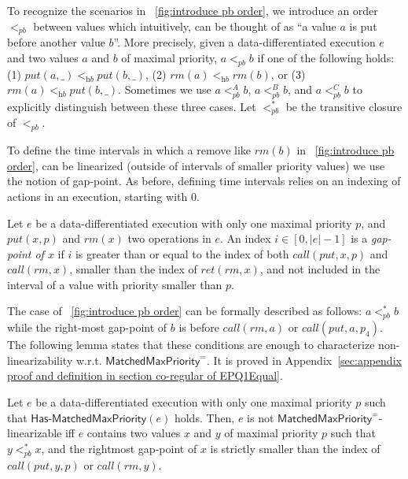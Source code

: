 To recognize the scenarios in \figurename~\ref{fig:introduce pb order}, we introduce an order $<_{\textit{pb}}$ between values which intuitively, can be thought of as ``a value $a$ is put before another value $b$''.
More precisely, given a data-differentiated execution $e$ and two values $a$ and $b$ of maximal priority, $a <_{\textit{pb}} b$ if one of the following holds: (1) $\textit{put}(a,\_) <_{\textit{hb}} \textit{put}(b,\_)$, (2) $\textit{rm}(a) <_{\textit{hb}} \textit{rm}(b)$, or (3) $\textit{rm}(a) <_{\textit{hb}} \textit{put}(b,\_)$. Sometimes we use $a <_{\textit{pb}}^A b$, $a <_{\textit{pb}}^B b$, and $a <_{\textit{pb}}^C b$ to explicitly distinguish between these three cases. Let $<_{\textit{pb}}^*$ be the transitive closure of $<_{\textit{pb}}$.

To define the time intervals in which a remove like $\textit{rm}(b)$ in \figurename~\ref{fig:introduce pb order}, can be linearized (outside of intervals of smaller priority values) we use the notion of gap-point. As before, defining time intervals relies on an indexing of actions in an execution, starting with 0.

\begin{definition}\label{def:gap-point for matched put and rm operations}
Let $e$ be a data-differentiated execution with only one maximal priority $p$, and $\textit{put}(x,p)$ and $\textit{rm}(x)$ two operations in $e$. An index $i\in [0,|e|-1]$ is a \emph{gap-point of $x$} if $i$ is greater than or equal to the index of both $\textit{call}(\textit{put},x,p)$ and $\textit{call}(\textit{rm},x)$, smaller than the index of $\textit{ret}(\textit{rm},x)$, and not included in the interval of a value with priority smaller than $p$.
\end{definition}

The case of \figurename~\ref{fig:introduce pb order} can be formally described as follows: $a <_{\textit{pb}}^* b$ while the right-most gap-point of $b$ is before $\textit{call}(\textit{rm},a)$ or $\textit{call}(\textit{put},a,p_4)$. The following lemma states that these conditions are enough to characterize non-linearizability w.r.t. $\mathsf{MatchedMaxPriority}^{=}$. It is proved in Appendix~\ref{sec:appendix proof and definition in section co-regular of EPQ1Equal}. 

\begin{lemma}
\label{lemma:EPQ1Equal as pb order and gap-point}
Let $e$ be a data-differentiated execution with only one maximal priority $p$ such that $\mathsf{Has\text{-}MatchedMaxPriority}(e)$ holds.
Then, $e$ is not $\mathsf{MatchedMaxPriority}^{=}$-linearizable iff $e$ contains two values $x$ and $y$ of maximal priority $p$ such that $y <_{\textit{pb}}^* x$, and the rightmost gap-point of $x$ is strictly smaller than the index of $\textit{call}(\textit{put},y,p)$ or $\textit{call}(\textit{rm},y)$.
\end{lemma}


